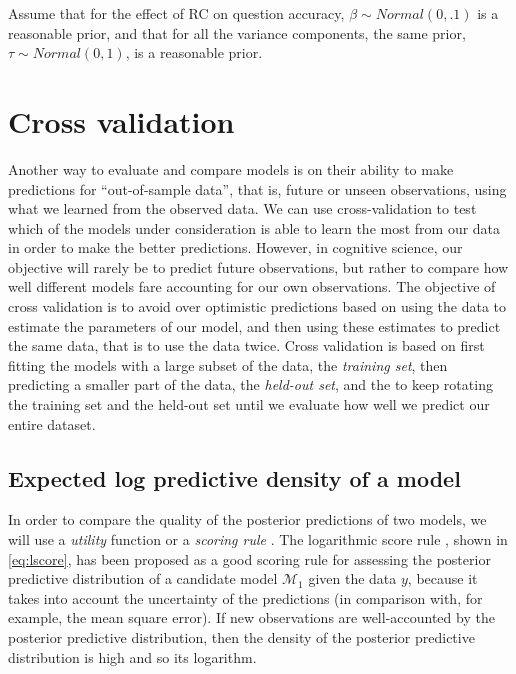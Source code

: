 \documentclass[12pt,]{krantz}
\theoremstyle{definition}
\theoremstyle{definition}
\theoremstyle{definition}
\theoremstyle{remark}
\begin{document}
Assume that for the effect of RC on question accuracy, \(\beta \sim Normal(0, .1)\) is a reasonable prior, and that for all the variance components, the same prior, \(\tau \sim Normal(0, 1)\), is a reasonable prior.

\hypertarget{ch:cv}{%
\chapter{Cross validation}\label{ch:cv}}

Another way to evaluate and compare models is on their ability to make predictions for ``out-of-sample data'', that is, future or unseen observations, using what we learned from the observed data. We can use cross-validation to test which of the models under consideration is able to learn the most from our data in order to make the better predictions. However, in cognitive science, our objective will rarely be to predict future observations, but rather to compare how well different models fare accounting for our own observations. The objective of cross validation is to avoid over optimistic predictions based on using the data to estimate the parameters of our model, and then using these estimates to predict the same data, that is to use the data twice. Cross validation is based on first fitting the models with a large subset of the data, the \emph{training set}, then predicting a smaller part of the data, the \emph{held-out set}, and the to keep rotating the training set and the held-out set until we evaluate how well we predict our entire dataset.

\hypertarget{expected-log-predictive-density-of-a-model}{%
\section{Expected log predictive density of a model}\label{expected-log-predictive-density-of-a-model}}

In order to compare the quality of the posterior predictions of two models, we will use a \emph{utility} function or a \emph{scoring rule} \citep[see][ for a review on scoring rules]{GneitingRaftery2007}. The logarithmic score rule \citep{Good1952}, shown in \eqref{eq:lscore}, has been proposed as a good scoring rule for assessing the posterior predictive distribution of a candidate model \(\mathcal{M}_1\) given the data \(y\), because it takes into account the uncertainty of the predictions (in comparison with, for example, the mean square error). If new observations are well-accounted by the posterior predictive distribution, then the density of the posterior predictive distribution is high and so its logarithm.
\end{document}
